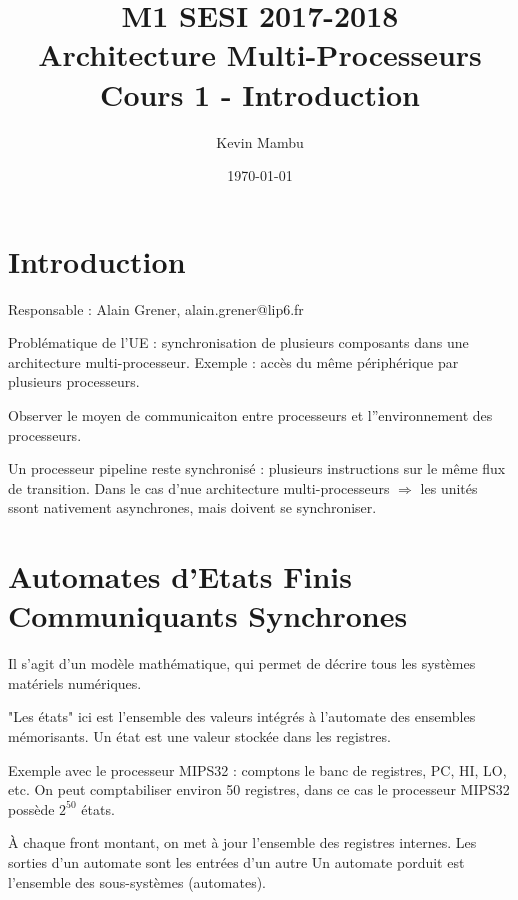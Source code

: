 \documentclass[10pt]{article}
\author{Kevin Mambu}
\date{\today}
\title{M1 SESI 2017-2018\\Architecture Multi-Processeurs\\Cours 1 - Introduction}
\begin{document}
\maketitle

\newpage
\tableofcontents

\newpage

\section{Introduction}
Responsable : Alain Grener, alain.grener@lip6.fr

Problématique de l'UE : synchronisation de plusieurs composants dans une architecture
multi-processeur. Exemple : accès du même périphérique par plusieurs processeurs.

Observer le moyen de communicaiton entre processeurs et l''environnement des
processeurs.

Un processeur pipeline reste synchronisé : plusieurs instructions sur le même flux
de transition. Dans le cas d'nue architecture multi-processeurs $\Rightarrow$
les unités ssont nativement asynchrones, mais doivent se synchroniser.

\section{Automates d'Etats Finis Communiquants Synchrones}

Il s'agit d'un modèle mathématique, qui permet de décrire tous les systèmes
matériels numériques.

"Les états" ici est l'ensemble des valeurs intégrés à l'automate des ensembles
mémorisants. Un état est une valeur stockée dans les registres.

Exemple avec le processeur MIPS32 : comptons le banc de registres, PC, HI, LO, etc.
On peut comptabiliser environ 50 registres, dans ce cas le processeur MIPS32
possède $2^{50}$ états.

À chaque front montant, on met à jour l'ensemble des registres internes.
Les sorties d'un automate sont les entrées d'un autre
Un automate porduit est l'ensemble des sous-systèmes (automates). \\
\end{document}
